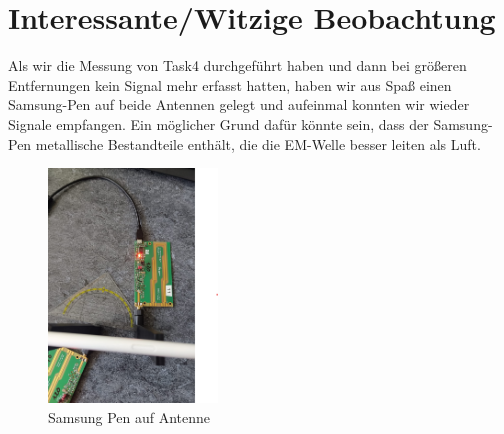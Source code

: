 \section{Interessante/Witzige Beobachtung}
Als wir die Messung von Task4 durchgeführt haben und dann bei größeren Entfernungen kein Signal mehr erfasst hatten,
haben wir aus Spaß einen Samsung-Pen auf beide Antennen gelegt und aufeinmal konnten wir wieder Signale empfangen.
Ein möglicher Grund dafür könnte sein, dass der Samsung-Pen metallische Bestandteile enthält,
die die EM-Welle besser leiten als Luft.

\begin{figure}[H]
    \centering
    \includegraphics[width=0.4\textwidth]{Pictures/stift.png}
    \caption{Samsung Pen auf Antenne}
\end{figure}